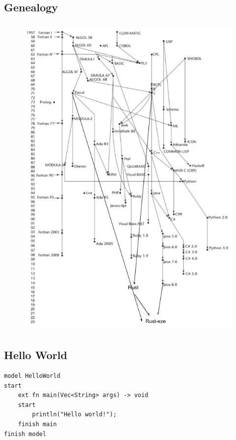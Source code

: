\documentclass[letterpaper, 10pt, DIV=13]{scrartcl}
\numberwithin{equation}{section}
\numberwithin{figure}{section}
\numberwithin{table}{section}
\begin{document}
\subsection{Genealogy}
\begin{figure}[ht]
    \centering
    \includegraphics[height=6.5in]{genealogy.jpg}
\end{figure}

\newpage

\subsection{Hello World}
\begin{lstlisting}[caption = HelloWorld.rez, frame = single, nolol]
model HelloWorld
start
    ext fn main(Vec<String> args) -> void
    start
        println("Hello world!");
    finish main
finish model
\end{lstlisting}
\end{document}
